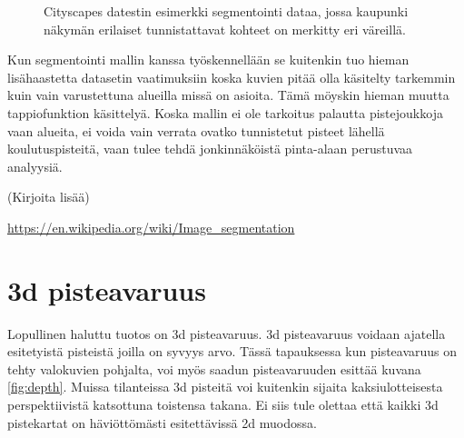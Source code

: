 \begin{figure}
\centering
{}
\caption[Tämä on lyhyt kuvateksti.]{Cityscapes datestin esimerkki segmentointi dataa, jossa kaupunki näkymän erilaiset tunnistattavat kohteet on merkitty eri väreillä.}
\label{fig:labels}
\end{figure}

Kun segmentointi mallin kanssa työskennellään se kuitenkin tuo hieman lisähaastetta datasetin vaatimuksiin koska kuvien pitää olla käsitelty tarkemmin kuin vain varustettuna alueilla missä on asioita. Tämä möyskin hieman muutta tappiofunktion käsittelyä. Koska mallin ei ole tarkoitus palautta pistejoukkoja vaan alueita, ei voida vain verrata ovatko tunnistetut pisteet lähellä koulutuspisteitä, vaan tulee tehdä jonkinnäköistä pinta-alaan perustuvaa analyysiä. 

(Kirjoita lisää)

\url{https://en.wikipedia.org/wiki/Image_segmentation}

\section{3d pisteavaruus}

Lopullinen haluttu tuotos on 3d  pisteavaruus. 3d pisteavaruus voidaan ajatella esitetyistä pisteistä joilla on syvyys arvo. Tässä tapauksessa kun pisteavaruus on tehty valokuvien pohjalta, voi myös saadun pisteavaruuden esittää kuvana \ref{fig:depth}. Muissa tilanteissa 3d pisteitä voi kuitenkin sijaita kaksiulotteisesta perspektiivistä katsottuna toistensa takana. Ei siis tule olettaa että kaikki 3d pistekartat on häviöttömästi esitettävissä 2d muodossa. 


